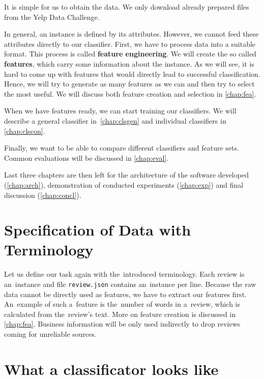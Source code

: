 It is simple for us to obtain the data. We only download already prepared files from the Yelp Data Challenge.

In general, an instance is defined by its attributes.
However, we cannot feed these attributes directly to our classifier.
First, we have to process data into a suitable format. This process is called {\bf feature engineering}.
We will create the so called {\bf features}, which carry some information about the instance.
As we will see, it is hard to come up with features that would directly lead to successful classification.
Hence, we will try to generate as many features as we can and then try to select the most useful.
We will discuss both feature creation and selection in \autoref{chap:fea}.

When we have features ready, we can start training our classifiers. We will describe a general classifier in~\ref{chap:clsgen} and
individual classifiers in \autoref{chap:clscon}.

Finally, we want to be able to compare different classifiers and feature sets. Common evaluations will be discussed in \ref{chap:eval}.

Last three chapters are then left for the architecture of the software developed (\autoref{chap:arch}), demonstration of conducted experiments (\autoref{chap:exp}) and final discussion (\autoref{chap:concl}).


\section{Specification of Data with Terminology}

Let us define our task again with the~introduced terminology.
Each review is an~instance and file \texttt{review.json} contains an~instance per line.
Because the raw data cannot be directly used as features, we have to extract our features first.
An~example of such a~feature is the~number of words in a~review, which is calculated from the~review's text.
More on feature creation is discussed in \autoref{chap:fea}.
Business information will be only used indirectly to drop reviews coming for unreliable sources.


\section{What a classificator looks like}

\subsection{}

